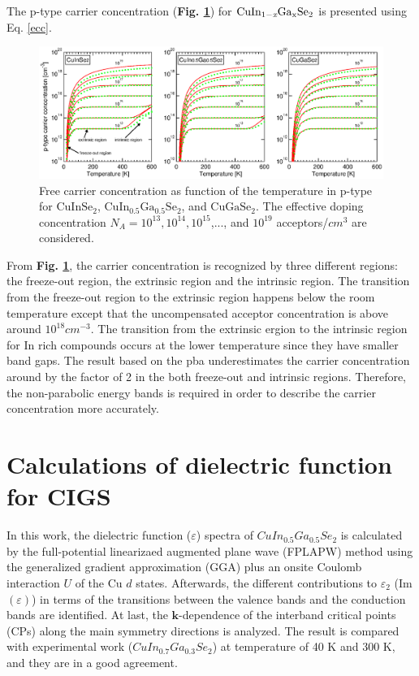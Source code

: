 \documentclass[a4paper, 12pt, titlepage,oneside,drop]{kthesis}
\begin{document}
The p-type carrier concentration (\textbf{Fig. \ref{ptypecc}}) for $\mathrm { CuIn_{1-\textit{x}}Ga_{x}Se_2}$ is presented using Eq. \ref{ecc}. 

 \begin{figure}[H]
    \begin{center}
            \includegraphics[width=1\textwidth,clip]{paper2figure9}
     \end{center}
    \caption{Free carrier concentration as function of the temperature in p-type for $\mathrm{CuInSe_2}$, $\mathrm{CuIn_{0.5}Ga_{0.5}Se_2}$, and $\mathrm{CuGaSe_2}$.
    The effective doping concentration $N_A = 10^{13}, 10^{14}, 10^{15}$,..., and  $10^{19}$ acceptors/$cm^3$ are considered.}
   \label{ptypecc}
\end{figure}

From \textbf{Fig. \ref{ptypecc}}, the carrier concentration is recognized by three different regions: the freeze-out region, the extrinsic region and the intrinsic region. The 
transition from the freeze-out region to the extrinsic region happens below the room temperature except that the uncompensated acceptor concentration is above around 
$10^{18} cm^{-3}$. The transition from the extrinsic ergion to the intrinsic region for In rich compounds occurs at the lower temperature since they have smaller band gaps.
The result based on the pba underestimates the carrier concentration around by the factor of 2 in the both freeze-out and intrinsic regions. Therefore, the 
non-parabolic energy bands is required in order to describe the carrier concentration more accurately.


\section{Calculations of dielectric function for CIGS}
In this work, the dielectric function ($\varepsilon$) spectra of $CuIn_{0.5}Ga_{0.5}Se_2$ is calculated by the full-potential linearizaed augmented plane wave (FPLAPW) method using the generalized gradient approximation (GGA)
plus an onsite Coulomb interaction $U$ of the Cu $d$ states. Afterwards, the different contributions to $\varepsilon_2$ (Im$(\varepsilon)$) in terms of the transitions between the valence bands and the conduction bands are identified. At last, 
the $\textbf{k}$-dependence of the interband critical points (CPs) along the main symmetry directions is analyzed. The result is compared with experimental work ($CuIn_{0.7}Ga_{0.3}Se_2$) at temperature of 40 K and 300 K,
and they are in a good agreement.
\end{document}
